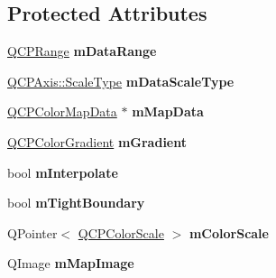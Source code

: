 \subsection*{Protected Attributes}
\begin{DoxyCompactItemize}
\item 
\hyperlink{class_q_c_p_range}{Q\+C\+P\+Range} {\bfseries m\+Data\+Range}\hypertarget{class_q_c_p_color_map_ab87609621d16cd3e9d52ad070b327b08}{}\label{class_q_c_p_color_map_ab87609621d16cd3e9d52ad070b327b08}

\item 
\hyperlink{class_q_c_p_axis_a36d8e8658dbaa179bf2aeb973db2d6f0}{Q\+C\+P\+Axis\+::\+Scale\+Type} {\bfseries m\+Data\+Scale\+Type}\hypertarget{class_q_c_p_color_map_ab28a4b2def408f83b9818799d5f18446}{}\label{class_q_c_p_color_map_ab28a4b2def408f83b9818799d5f18446}

\item 
\hyperlink{class_q_c_p_color_map_data}{Q\+C\+P\+Color\+Map\+Data} $\ast$ {\bfseries m\+Map\+Data}\hypertarget{class_q_c_p_color_map_a8709272aa8f0be3ca111bf3866806f8b}{}\label{class_q_c_p_color_map_a8709272aa8f0be3ca111bf3866806f8b}

\item 
\hyperlink{class_q_c_p_color_gradient}{Q\+C\+P\+Color\+Gradient} {\bfseries m\+Gradient}\hypertarget{class_q_c_p_color_map_aab77fe9a8df6f0486ab3507cc5f278fa}{}\label{class_q_c_p_color_map_aab77fe9a8df6f0486ab3507cc5f278fa}

\item 
bool {\bfseries m\+Interpolate}\hypertarget{class_q_c_p_color_map_af77e5eba9a844592648edeb6fbe834f1}{}\label{class_q_c_p_color_map_af77e5eba9a844592648edeb6fbe834f1}

\item 
bool {\bfseries m\+Tight\+Boundary}\hypertarget{class_q_c_p_color_map_ac2e9425fe4381b496726e1c09f978302}{}\label{class_q_c_p_color_map_ac2e9425fe4381b496726e1c09f978302}

\item 
Q\+Pointer$<$ \hyperlink{class_q_c_p_color_scale}{Q\+C\+P\+Color\+Scale} $>$ {\bfseries m\+Color\+Scale}\hypertarget{class_q_c_p_color_map_a95b4100bacc3387652c988b071ec9db7}{}\label{class_q_c_p_color_map_a95b4100bacc3387652c988b071ec9db7}

\item 
Q\+Image {\bfseries m\+Map\+Image}\hypertarget{class_q_c_p_color_map_a66110813b42eca78b64095b2a1f285a0}{}\label{class_q_c_p_color_map_a66110813b42eca78b64095b2a1f285a0}


\end{DoxyCompactItemize}
